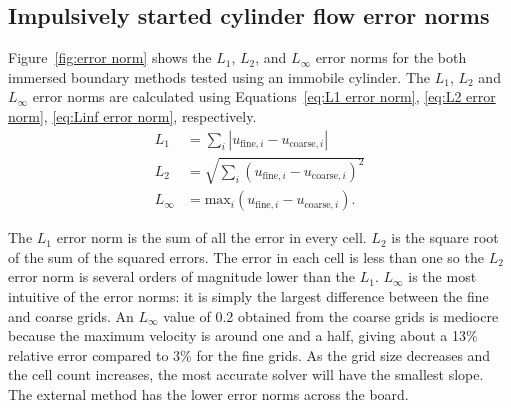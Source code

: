 \documentclass[preprint,12pt]{elsarticle}
\begin{document}
\subsection{Impulsively started cylinder flow error norms}
Figure~\ref{fig:error norm} shows the $L_1$, $L_2$, and $L_\infty$ error norms for the both immersed boundary methods tested using an immobile cylinder.
The $L_1$, $L_2$ and $L_\infty$ error norms are calculated using Equations~\eqref{eq:L1 error norm}, \eqref{eq:L2 error norm}, \eqref{eq:Linf error norm}, respectively.
\begin{align}
L_1 &= \sum_{i} \left|u_{\text{fine}, i}-u_{\text{coarse},i}\right| \label{eq:L1 error norm} \\
L_2 &= \sqrt{\sum_{i} \left(u_{\text{fine}, i}-u_{\text{coarse},i}\right)^2} \label{eq:L2 error norm} \\
L_{\infty} &= \text{max}_i\left(u_{\text{fine}, i}-u_{\text{coarse},i}\right) .\ \label{eq:Linf error norm}
\end{align}

The $L_1$ error norm is the sum of all the error in every cell. 
$L_2$ is the square root of the sum of the squared errors. 
The error in each cell is less than one so the $L_2$ error norm is several orders of magnitude lower than the $L_1$. 
$L_\infty$ is the most intuitive of the error norms: it is simply the largest difference between the fine and coarse grids. 
An $L_\infty$ value of 0.2 obtained from the coarse grids is mediocre because the maximum velocity is around one and a half, giving about a 13\% relative error compared to 3\% for the fine grids. 
As the grid size decreases and the cell count increases, the most accurate solver will have the smallest slope. 
The external method has the lower error norms across the board. 
\end{document}
